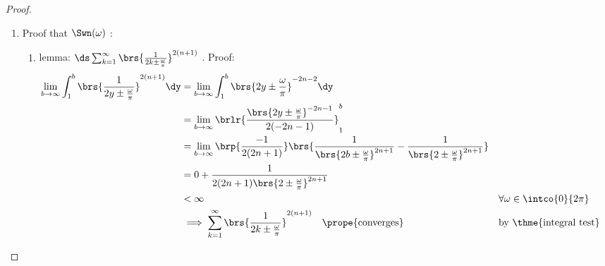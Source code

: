 \begin{proof}
\begin{enumerate}
\begin{enumerate}
      \item Proof that $\Swn(\omega)$ : \label{item:Nriesz_Gw_converges}
        \begin{enumerate}
          \item lemma: $\ds\sum_{k=1}^\infty \brs{\frac{1}{2k\pm\frac{\omega}{\pi}}}^{2(n+1)}$ . Proof: \label{ilem:Nriesz_Gw_converges_pm}
            \begin{align*}
              \lim_{b\to\infty}\int_1^b \brs{\frac{1}{2y\pm\frac{\omega}{\pi}}}^{2(n+1)} \dy
                &= \lim_{b\to\infty}\int_1^b \brs{2y\pm\frac{\omega}{\pi}}^{-2n-2} \dy
              \\&= \lim_{b\to\infty} \brlr{\frac{\brs{2y\pm\frac{\omega}{\pi}}^{-2n-1}}{2(-2n-1)}}_1^b
              \\&= \lim_{b\to\infty} \brp{\frac{-1}{2(2n+1)}}
                                     \brs{\frac{1}{\brs{2b\pm\frac{\omega}{\pi}}^{2n+1}}
                                         -\frac{1}{\brs{2 \pm\frac{\omega}{\pi}}^{2n+1}}
                                         }
              \\&= 0 + \frac{1}{2(2n+1)\brs{2 \pm\frac{\omega}{\pi}}^{2n+1}}
              \\&< \infty
                && \forall \omega\in\intco{0}{2\pi}
              \\&\implies \sum_{k=1}^\infty \brs{\frac{1}{2k\pm\frac{\omega}{\pi}}}^{2(n+1)} \quad\text{\prope{converges}}
                && \text{by \thme{integral test}}
            \end{align*}


\end{enumerate}
\end{enumerate}
\end{enumerate}
\end{proof}
